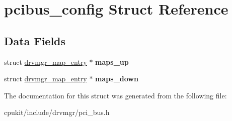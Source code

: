 \hypertarget{structpcibus__config}{}\section{pcibus\+\_\+config Struct Reference}
\label{structpcibus__config}
\subsection*{Data Fields}
\begin{DoxyCompactItemize}
\item 
\mbox{\label{structpcibus__config_a64ec8d3ed141ea3e3fe516d3f7f4a350}} 
struct \mbox{\hyperlink{structdrvmgr__map__entry}{drvmgr\+\_\+map\+\_\+entry}} $\ast$ {\bfseries maps\+\_\+up}
\item 
\mbox{\label{structpcibus__config_a8aceb8c80cef1a8b5a3070f9777a27cd}} 
struct \mbox{\hyperlink{structdrvmgr__map__entry}{drvmgr\+\_\+map\+\_\+entry}} $\ast$ {\bfseries maps\+\_\+down}
\end{DoxyCompactItemize}


The documentation for this struct was generated from the following file\+:\begin{DoxyCompactItemize}
\item 
cpukit/include/drvmgr/pci\+\_\+bus.\+h\end{DoxyCompactItemize}
